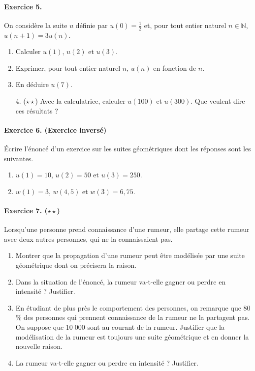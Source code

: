 \documentclass[11pt]{article}
\begin{document}
\paragraph{Exercice 5.} On considère la suite $u$ définie par
$u(0)=\frac{1}{2}$ et, pour tout entier naturel $n\in\mathbb{N}$,
$u(n+1)=3u(n)$.
\begin{enumerate}
  \item Calculer $u(1)$, $u(2)$ et $u(3)$.
  \item Exprimer, pour tout entier naturel $n$, $u(n)$ en fonction de $n$.
  \item En déduire $u(7)$.
  \item[4. ($\star\star$)] Avec la calculatrice, calculer $u(100)$ et $u(300)$. Que
    veulent dire ces résultats ?
\end{enumerate}

\paragraph{Exercice 6. (Exercice inversé)} Écrire l'énoncé d'un exercice sur les
suites géométriques dont les réponses sont les suivantes.
\begin{enumerate}
  \item $u(1)=10$, $u(2)=50$ et $u(3)=250$.
  \item $w(1)=3$, $w(4,5)$ et $w(3)=6,75$.
\end{enumerate}

\paragraph{Exercice 7. ($\star\star$)} Lorsqu'une personne prend connaissance d'une rumeur,
elle partage cette rumeur avec deux autres personnes, qui ne la connaissaient
pas.
\begin{enumerate}
  \item Montrer que la propagation d'une rumeur peut être modélisée par une
    suite géométrique dont on précisera la raison.
  \item Dans la situation de l'énoncé, la rumeur va-t-elle gagner ou perdre en
    intensité ? Justifier.
  \item En étudiant de plus près le comportement des personnes, on remarque que
    $80$\% des personnes qui prennent connaissance de la rumeur ne la partagent
    pas. On suppose que $10\;000$ sont au courant de la rumeur. Justifier que la
    modélisation de la rumeur est toujours une suite géométrique et en donner la
    nouvelle raison.
  \item La rumeur va-t-elle gagner ou perdre en intensité ? Justifier.
\end{enumerate}
\end{document}
